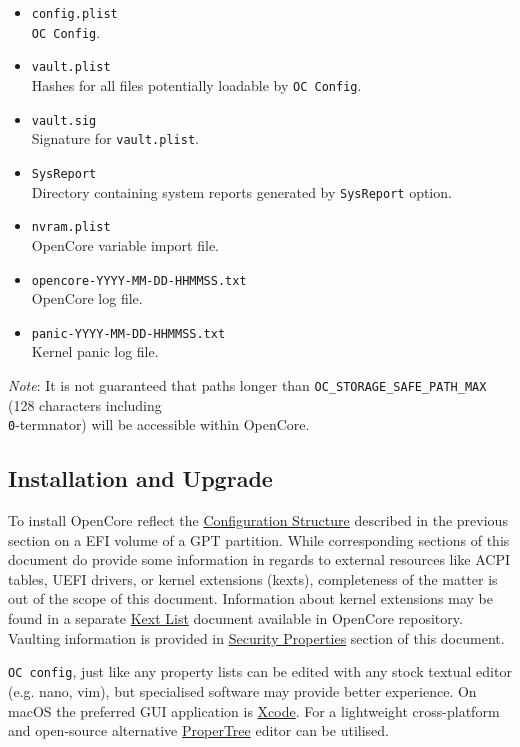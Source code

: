 \documentclass[]{article}
\makeatletter
\renewcommand{\label}[1]{%
\zref@wrapper@immediate{\oldlabel{#1}}}  %
\makeatother
\begin{document}
\begin{itemize}
\item
  \texttt{config.plist} \\
  \texttt{OC Config}.
\item
  \texttt{vault.plist} \\
  Hashes for all files potentially loadable by \texttt{OC Config}.
\item
  \texttt{vault.sig} \\
  Signature for \texttt{vault.plist}.
\item
  \texttt{SysReport} \\
  Directory containing system reports generated by \texttt{SysReport} option.
\item
  \texttt{nvram.plist} \\
  OpenCore variable import file.
\item
  \texttt{opencore-YYYY-MM-DD-HHMMSS.txt} \\
  OpenCore log file.
\item
  \texttt{panic-YYYY-MM-DD-HHMMSS.txt} \\
  Kernel panic log file.
\end{itemize}

\emph{Note}: It is not guaranteed that paths longer than
\texttt{OC\_STORAGE\_SAFE\_PATH\_MAX} (128 characters including
\texttt{\\0}-termnator) will be accessible within OpenCore.

\subsection{Installation and Upgrade}\label{configuration-install}

To install OpenCore reflect the
\hyperref[configuration-structure]{Configuration Structure} described
in the previous section on a EFI volume of a GPT partition. While
corresponding sections of this document do provide some information
in regards to external resources like ACPI tables, UEFI drivers,
or kernel extensions (kexts), completeness of the matter is out of
the scope of this document. Information about kernel extensions may
be found in a separate
\href{https://github.com/acidanthera/OpenCorePkg/blob/master/Docs/Kexts.md}{Kext List}
document available in OpenCore repository. Vaulting information is provided in
\hyperref[miscsecurityprops]{Security Properties} section of this document.

\texttt{OC\ config}, just like any property lists can be edited with any
stock textual editor (e.g. nano, vim), but specialised software may provide
better experience. On macOS the preferred GUI application is
\href{https://developer.apple.com/xcode}{Xcode}. For a lightweight
cross-platform and open-source alternative
\href{https://github.com/corpnewt/ProperTree}{ProperTree} editor can be
utilised.
\end{document}
